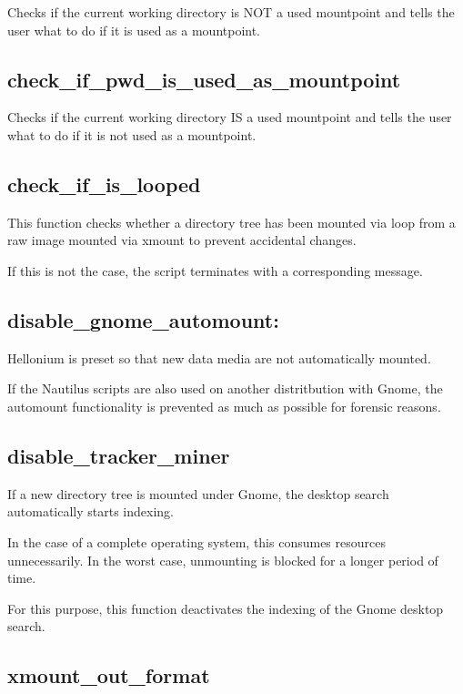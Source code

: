 Checks if the current working directory is NOT a used mountpoint and tells the user what to do if it is used as a mountpoint.

\subsection{check\_if\_pwd\_is\_used\_as\_mountpoint}

Checks if the current working directory IS a used mountpoint and tells the user what to do if it is not used as a mountpoint.

\subsection{check\_if\_is\_looped}

This function checks whether a directory tree has been mounted via loop from a raw image mounted via xmount to prevent accidental changes.

If this is not the case, the script terminates with a corresponding message.

\subsection{disable\_gnome\_automount: }

Hellonium is preset so that new data media are not automatically mounted.

If the Nautilus scripts are also used on another distritbution with Gnome, the automount functionality is prevented as much as possible for forensic reasons.

\subsection{disable\_tracker\_miner}

If a new directory tree is mounted under Gnome, the desktop search automatically starts indexing.

In the case of a complete operating system, this consumes resources unnecessarily. In the worst case, unmounting is blocked for a longer period of time.

For this purpose, this function deactivates the indexing of the Gnome desktop search.

\subsection{xmount\_out\_format}

